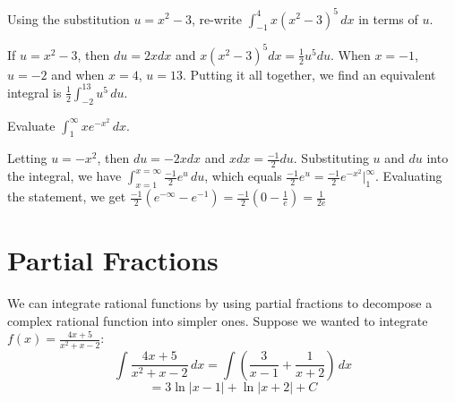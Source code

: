 \begin{Exercise}[label=int_meth1]
Using the substitution $u = x^2 - 3$, re-write $\int_{-1}^4 x(x^2 - 3)
^5\,dx$ in terms of $u$.
\end{Exercise}

\begin{Answer}[ref=int_meth1]
If $u = x^2 - 3$, then $du = 2x dx$ and $x(x^2 - 3)^5 dx = \frac{1}{2}
u^5 du$. When $x = -1$, $u = -2$ and when $x = 4$, $u = 13$. Putting 
it all together, we find an equivalent integral is $\frac{1}{2}\int
_{-2}^{13} u^5\,du$. 
\end{Answer}

\begin{Exercise}[label=int_meth4]
Evaluate $\int_1^{\infty}xe^{-x^2}\,dx$. 
\end{Exercise}

\begin{Answer}[ref=int_meth4]
Letting $u = -x^2$, then $du = -2x dx$ and $x dx = \frac{-1}{2}du$. 
Substituting $u$ and $du$ into the integral, we have $\int_{x = 1}^{x 
= \infty} \frac{-1}{2}e^u\,du$, which equals $\frac{-1}{2}e^u = 
\frac{-1}{2}e^{-x^2}|_1^{\infty}$. Evaluating the statement, we get 
$\frac{-1}{2}(e^{-\infty} - e^{-1}) = \frac{-1}{2}(0-\frac{1}{e}) = 
\frac{1}{2e}$
\end{Answer}


\section{Partial Fractions}
We can integrate rational functions by using partial fractions to decompose a 
complex rational function into simpler ones. Suppose we wanted to integrate $f(x) = \frac{4x + 5}{x^2 + x - 2}$:
$$\int \frac{4x + 5}{x^2 + x - 2}\,dx = \int \left( \frac{3}{x - 1} + \frac{1}{
x + 2} \right)\,dx$$
$$= 3\ln{|x - 1|} + \ln{|x + 2|} + C$$

